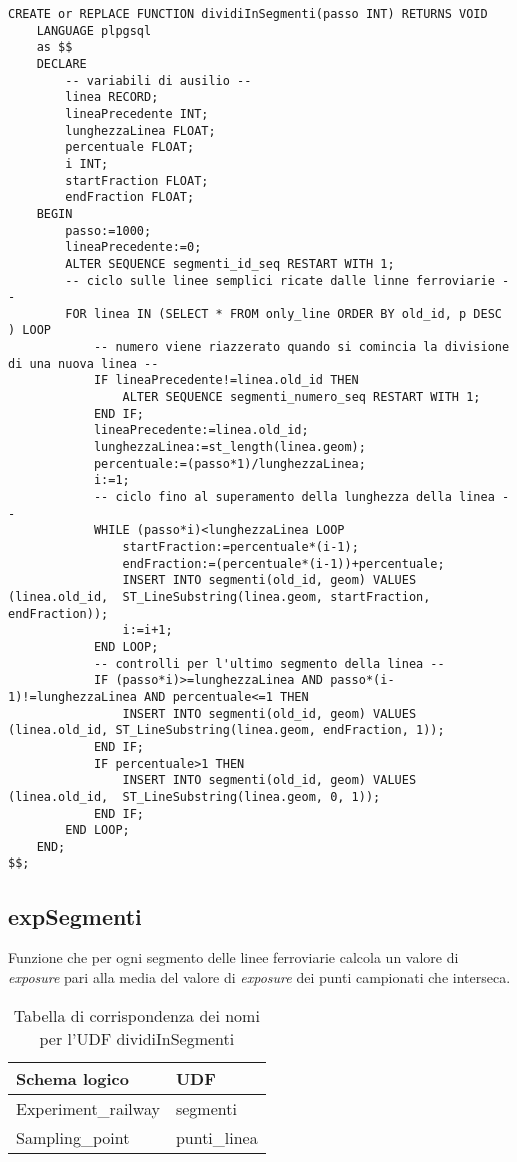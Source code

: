 \begin{lstlisting}[style=mySQL]
CREATE or REPLACE FUNCTION dividiInSegmenti(passo INT) RETURNS VOID
	LANGUAGE plpgsql
	as $$
	DECLARE
		-- variabili di ausilio --
		linea RECORD;
		lineaPrecedente INT;
		lunghezzaLinea FLOAT;
		percentuale FLOAT;
		i INT;
		startFraction FLOAT;
		endFraction FLOAT;
	BEGIN
		passo:=1000;
		lineaPrecedente:=0;
		ALTER SEQUENCE segmenti_id_seq RESTART WITH 1;
		-- ciclo sulle linee semplici ricate dalle linne ferroviarie --
		FOR linea IN (SELECT * FROM only_line ORDER BY old_id, p DESC ) LOOP
			-- numero viene riazzerato quando si comincia la divisione di una nuova linea --
			IF lineaPrecedente!=linea.old_id THEN
				ALTER SEQUENCE segmenti_numero_seq RESTART WITH 1;
			END IF;
			lineaPrecedente:=linea.old_id;
			lunghezzaLinea:=st_length(linea.geom);
			percentuale:=(passo*1)/lunghezzaLinea;
			i:=1;
			-- ciclo fino al superamento della lunghezza della linea --
			WHILE (passo*i)<lunghezzaLinea LOOP
				startFraction:=percentuale*(i-1);
				endFraction:=(percentuale*(i-1))+percentuale;
				INSERT INTO segmenti(old_id, geom) VALUES (linea.old_id,  ST_LineSubstring(linea.geom, startFraction, endFraction));
				i:=i+1;
			END LOOP;
			-- controlli per l'ultimo segmento della linea --
			IF (passo*i)>=lunghezzaLinea AND passo*(i-1)!=lunghezzaLinea AND percentuale<=1 THEN
				INSERT INTO segmenti(old_id, geom) VALUES (linea.old_id, ST_LineSubstring(linea.geom, endFraction, 1));
			END IF;
			IF percentuale>1 THEN
				INSERT INTO segmenti(old_id, geom) VALUES (linea.old_id,  ST_LineSubstring(linea.geom, 0, 1));
			END IF;
		END LOOP;
	END;
$$;
\end{lstlisting}

\subsection{expSegmenti}
Funzione che per ogni segmento delle linee ferroviarie calcola un valore di \textit{exposure} pari alla media del valore di \textit{exposure} dei punti campionati che interseca.\\

\begin{table}[h]
\centering
\caption{Tabella di corrispondenza dei nomi per l'UDF dividiInSegmenti}
\label{mapTb6}
\begin{tabular}{|l|l|}
\hline
Schema logico       & UDF                \\ \hline
Experiment\_railway          & segmenti              \\ 
Sampling\_point          & punti\_linea              \\ \hline
\end{tabular}
\end{table}

